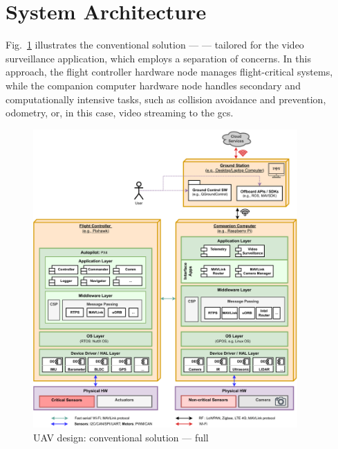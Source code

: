 \section{System Architecture}
\label{sec:design-sysArch}
Fig.~\ref{fig:uav-design-conv-sol-1} illustrates the conventional solution ---
 --- tailored for the video surveillance application, which employs a
separation of concerns. In this approach, the flight controller hardware node
manages flight-critical systems, while the companion computer hardware node
handles secondary and computationally intensive tasks, such as collision
avoidance and prevention, odometry, or, in this case, video streaming to the
\gls{gcs}.

\begin{figure}[!hbt]
  \centering
  \includegraphics[width=0.9\textwidth]{./img/pdf/uav-main-design-conv-sol-1.pdf} 
%   
  \caption{UAV design: conventional solution --- full}%
  \label{fig:uav-design-conv-sol-1}
\end{figure}

